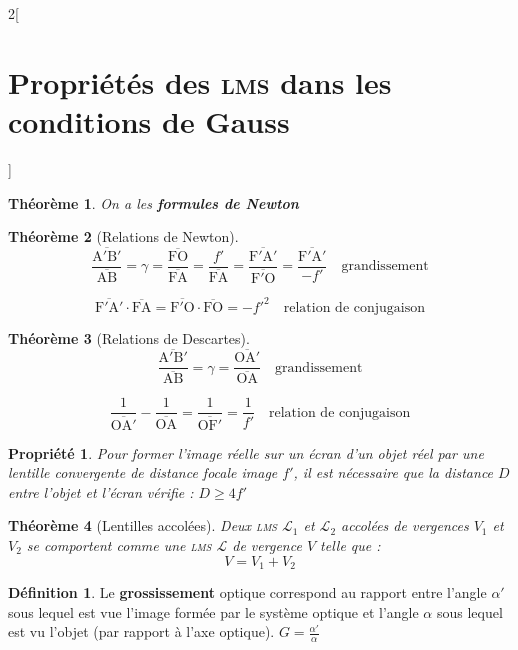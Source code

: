 \documentclass[french]{book}
\newtheorem*{theoreme}{Théorème}
\newtheorem*{propriete}{Propriété}
\theoremstyle{definition}
\newtheorem*{definition}{Définition}
\theoremstyle{remark}
\newcommand*{\point}[1]{\mathrm{#1}}
\newcommand*{\algebrique}[1]{\overline{#1}}
\newcommand*{\tdef}[1]{\textbf{#1}}
\newcommand*{\imp}[1]{\emph{#1}}
\newcommand*{\abr}[1]{\textsc{#1}}
\begin{document}
\begin{landscape}
\begin{multicols*}{2}[\section{Propriétés des \abr{lms} dans les conditions de Gauss}]
\begin{theoreme}
On a les \tdef{formules de Newton}
\end{theoreme}

\begin{theoreme}[Relations de Newton]

\[
\frac{\algebrique{\point{A'}\point{B'}}}{\algebrique{\point{A}\point{B}}} = \gamma 
= \frac{\algebrique{\point{F}\point{O}}}{\algebrique{\point{F}\point{A}}}
= \frac{f'}{\algebrique{\point{F}\point{A}}}
= \frac{\algebrique{\point{F'}\point{A'}}}{\algebrique{\point{F'}\point{O}}}
= \frac{\algebrique{\point{F'}\point{A'}}}{-f'}
\quad \text{grandissement}
\]

\[
\algebrique{\point{F'}\point{A'}} \cdot \algebrique{\point{F}\point{A}}
= \algebrique{\point{F'}\point{O}} \cdot \algebrique{\point{F}\point{O}} 
= -{f'}^2
\quad \text{relation de conjugaison}
\]

\end{theoreme}

\begin{theoreme}[Relations de Descartes]

\[
\frac{\algebrique{\point{A'}\point{B'}}}{\algebrique{\point{A}\point{B}}} = \gamma 
= \frac{\algebrique{\point{O}\point{A'}}}{\algebrique{\point{O}\point{A}}}
\quad \text{grandissement}
\]

\[
\frac{1}{\algebrique{\point{O}\point{A'}}} - \frac{1}{\algebrique{\point{O}\point{A}}}
= \frac{1}{\algebrique{\point{O}\point{F'}}}
= \frac{1}{f'}
\quad \text{relation de conjugaison}
\]

\end{theoreme}

\begin{propriete}

Pour former l'image réelle sur un écran d'un objet réel par une lentille convergente de distance focale image $f'$, il est nécessaire que la distance $D$ entre l'objet et l'écran vérifie : \imp{$D \geq 4f'$}

\end{propriete}

\begin{theoreme}[Lentilles accolées]
Deux \imp{\abr{lms}} $\mathscr{L}_1$ et $\mathscr{L}_2$ \imp{accolées} de vergences $V_1$ et $V_2$ se comportent comme une \abr{lms} $\mathscr{L}$ de vergence $V$ telle que :
\[V = V_1 + V_2\]
\end{theoreme}

\begin{definition}

Le \tdef{grossissement} optique correspond au  rapport entre l’angle $\alpha'$ sous lequel est vue l’image formée par le système optique et l’angle $\alpha$ sous lequel est vu l’objet (par rapport à l'axe optique). \imp{$G = \frac{\alpha'}{\alpha}$}

\end{definition}

\end{multicols*}
\end{landscape}
\end{document}
